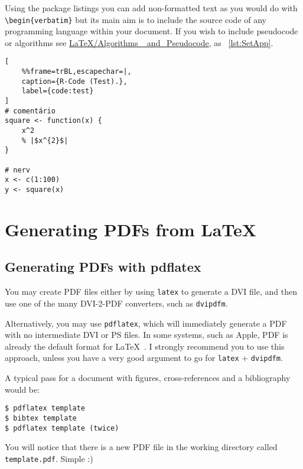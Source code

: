 Using the package listings you can add non-formatted text as you would do with \verb|\begin{verbatim}| but its main aim is to include the source code of any programming language within your document. If you wish to include pseudocode or algorithms see \href{http://en.wikibooks.org/wiki/LaTeX/Algorithms_and_Pseudocode}{LaTeX/Algorithms\_ and\_Pseudocode}, as \lstlistingname ~\ref{lst:SetApp}.


\begin{minipage}{\textwidth}
\lstset{language=R,numbers=left}
\begin{lstlisting}[
    %%frame=trBL,escapechar=|,
    caption={R-Code (Test).},
    label={code:test}
]
# comentário
square <- function(x) {
    x^2
    % |$x^{2}$|
}

# nerv
x <- c(1:100)
y <- square(x)
\end{lstlisting}
\end{minipage}
\section{Generating PDFs from \LaTeX~} %
\label{sec:generating_pdfs_from_latex}

\subsection{Generating PDFs with pdflatex} %
\label{ssec:generating_pdfs_with_pdflatex}

You may create PDF files either by using \verb|latex| to generate a DVI file, and then use one of the many DVI-2-PDF converters, such as \verb|dvipdfm|.

Alternatively, you may use \verb|pdflatex|, which will immediately generate a PDF with no intermediate DVI or PS files. In some systems, such as Apple, PDF is already the default format for \LaTeX~. I strongly recommend you to use this approach, unless you have a very good argument to go for \verb|latex| + \verb|dvipdfm|.

A typical pass for a document with figures, cross-references and a bibliography would be:
\begin{verbatim}
$ pdflatex template
$ bibtex template
$ pdflatex template (twice)
\end{verbatim}
\begin{sloppypar}
You will notice that there is a new PDF file in the working directory called \verb|template.pdf|. Simple :)
\end{sloppypar}


